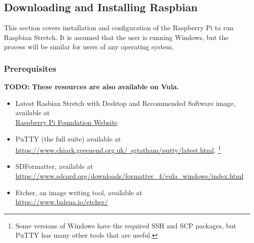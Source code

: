\subsection{Downloading and Installing Raspbian}
This section covers installation and configuration of the Raspberry Pi to run Raspbian Stretch. It is assumed that the user is running Windows, but the process will be similar for users of any operating system.

\subsubsection{Prerequisites}
\label{sec:Prereqs}
\textbf{TODO: These resources are also available on Vula.}
\begin{itemize}
    \item Latest Rasbian Stretch with Desktop and Recommended Software image, available at\\ \href{https://www.raspberrypi.org/downloads/raspbian}{Raspberry Pi Foundation Website}
    \item PuTTY (the full suite) available at\\ \href{https://www.chiark.greenend.org.uk/~sgtatham/putty/latest.html}{https://www.chiark.greenend.org.uk/~sgtatham/putty/latest.html}. \footnote{Some versions of Windows have the required SSH and SCP packages, but PuTTY has many other tools that are useful.}
    \item SDFormatter, available at\\ \href{https://www.sdcard.org/downloads/formatter_4/eula_windows/index.html}{https://www.sdcard.org/downloads/formatter\_4/eula\_windows/index.html}
    \item Etcher, an image writing tool, available at\\
    \href{https://www.balena.io/etcher/}{https://www.balena.io/etcher/}
\end{itemize}

